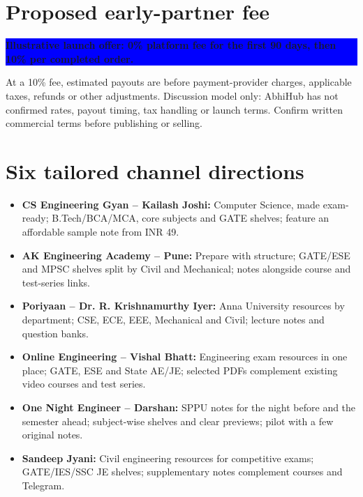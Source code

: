 \documentclass[10pt]{article}
\begin{document}
\section{Proposed early-partner fee}
\colorbox{blue}{\parbox{\dimexpr\linewidth-2\fboxsep}{\color{white}\textbf{Illustrative launch offer: 0\% platform fee for the first 90 days, then 10\% per completed order.}}}\par\vspace{2mm}
{\footnotesize\color{muted}At a 10\% fee, estimated payouts are before payment-provider charges, applicable taxes, refunds or other adjustments. Discussion model only: AbhiHub has not confirmed rates, payout timing, tax handling or launch terms. Confirm written commercial terms before publishing or selling.}
\section{Six tailored channel directions}
\begin{itemize}
\item \textbf{CS Engineering Gyan -- Kailash Joshi:} Computer Science, made exam-ready; B.Tech/BCA/MCA, core subjects and GATE shelves; feature an affordable sample note from INR 49.
\item \textbf{AK Engineering Academy -- Pune:} Prepare with structure; GATE/ESE and MPSC shelves split by Civil and Mechanical; notes alongside course and test-series links.
\item \textbf{Poriyaan -- Dr. R. Krishnamurthy Iyer:} Anna University resources by department; CSE, ECE, EEE, Mechanical and Civil; lecture notes and question banks.
\item \textbf{Online Engineering -- Vishal Bhatt:} Engineering exam resources in one place; GATE, ESE and State AE/JE; selected PDFs complement existing video courses and test series.
\item \textbf{One Night Engineer -- Darshan:} SPPU notes for the night before and the semester ahead; subject-wise shelves and clear previews; pilot with a few original notes.
\item \textbf{Sandeep Jyani:} Civil engineering resources for competitive exams; GATE/IES/SSC JE shelves; supplementary notes complement courses and Telegram.
\end{itemize}
\end{document}
